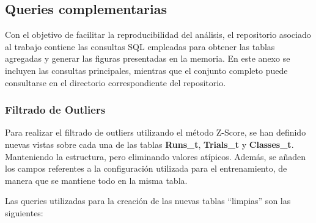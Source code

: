 \newpage

\subsection{Queries complementarias}\label{sec:anexo_queries}

Con el objetivo de facilitar la reproducibilidad del análisis, el repositorio asociado al trabajo contiene las consultas SQL empleadas para obtener las tablas agregadas y generar las figuras presentadas en la memoria. En este anexo se incluyen las consultas principales, mientras que el conjunto completo puede consultarse en el directorio correspondiente del repositorio.

\subsubsection{Filtrado de Outliers}\label{sec:anexo_outliers}

Para realizar el filtrado de outliers utilizando el método Z-Score, se han definido nuevas vistas sobre cada una de las tablas \textbf{Runs\_t}, \textbf{Trials\_t} y \textbf{Classes\_t}. Manteniendo la estructura, pero eliminando valores atípicos. Además, se añaden los campos referentes a la configuración utilizada para el entrenamiento, de manera que se mantiene todo en la misma tabla.

Las queries utilizadas para la creación de las nuevas tablas ``limpias'' son las siguientes:

